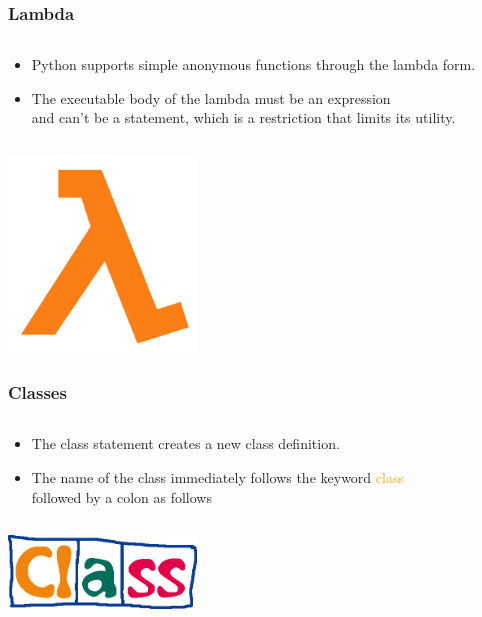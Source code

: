 \documentclass{beamer}
\begin{document}
\begin{frame}[fragile]
	\frametitle{Lambda}
	\begin{columns}[c]
		\begin{column}{30cm}
			\vspace{.1cm}
			\begin{itemize}
				\justifying
				\item Python supports simple anonymous functions through the lambda form.
				\item The executable body of the lambda must be an expression \\
				and can't be a statement, which is a restriction that limits its utility.
			\end{itemize}
		\end{column}
	\end{columns}
	\vspace{.1cm}
	\hspace*{5cm} \includegraphics[width=5cm]{figs/lambda.png}
\end{frame}

\begin{frame}
	\frametitle{Classes}
	\begin{columns}[c]
		\begin{column}{30cm}
			\vspace{.1cm}
			\begin{itemize}
				\justifying
				\item The class statement creates a new class definition.
				\item The name of the class immediately follows the keyword \textcolor{orange}{class} \\
				followed by a colon as follows
			\end{itemize}
		\end{column}
	\end{columns}
	\vspace{.5cm}
	\hspace*{5.5cm} \includegraphics[width=5cm]{figs/class.jpg}
\end{frame}
\end{document}
